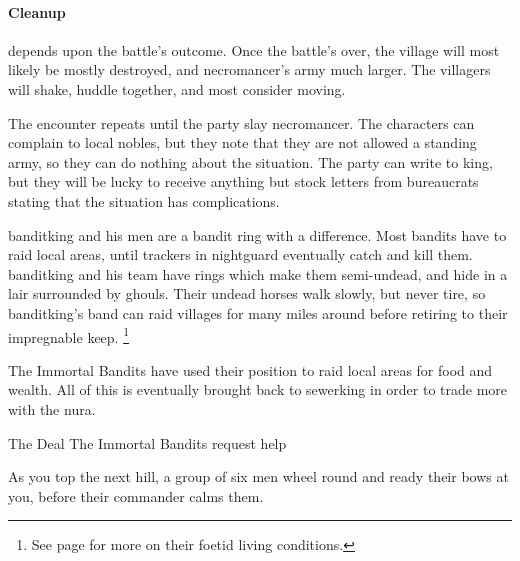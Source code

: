 \begin{multicols}{2}
\paragraph{Cleanup} depends upon the battle's outcome.
Once the battle's over, the village will most likely be mostly destroyed, and \gls{necromancer}'s army much larger.  The villagers will shake, huddle together, and most consider moving.

The encounter repeats until the party slay \gls{necromancer}.
The characters can complain to local nobles, but they note that they are not allowed a standing army, so they can do nothing about the situation.
The party can write to \gls{king}, but they will be lucky to receive anything but stock letters from bureaucrats stating that the situation has complications.


\resumecontents[Town]

\stopcontents[sq]

\label{immortalbandits}

\stopcontents[Town]

\startcontents[sq]

\sqminitoc

\noindent
\Gls{banditking} and his men are a bandit ring with a difference.
Most bandits have to raid local areas, until trackers in \gls{nightguard} eventually catch and kill them.
\Gls{banditking} and his team have rings which make them semi-undead, and hide in a lair surrounded by ghouls.
Their undead horses walk slowly, but never tire, so \gls{banditking}'s band can raid villages for many miles around before retiring to their impregnable keep.%
\footnote{See page \pageref{necromancers_lair} for more on their foetid living conditions.}

The Immortal Bandits have used their position to raid local areas for food and wealth.
All of this is eventually brought back to \gls{sewerking} in order to trade more with the nura.

{The Deal}%
{The Immortal Bandits request help}%

\begin{boxtext}

	As you top the next hill, a group of six men wheel round and ready their bows at you, before their commander calms them.

\end{boxtext}


\end{multicols}

